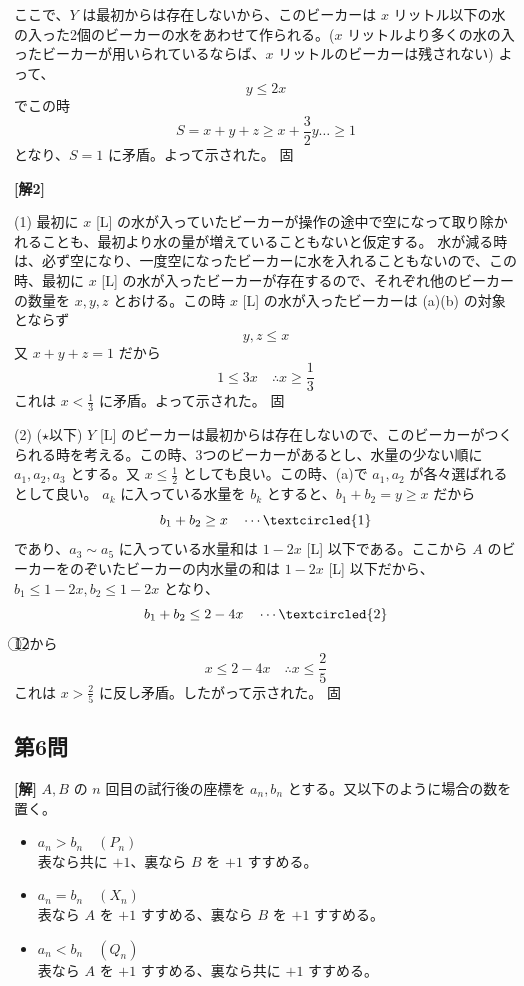 \documentclass[../main.tex]{subfiles}
\begin{document}
ここで、$Y$ は最初からは存在しないから、このビーカーは $x$ リットル以下の水の入った2個のビーカーの水をあわせて作られる。($x$ リットルより多くの水の入ったビーカーが用いられているならば、$x$ リットルのビーカーは残されない)
よって、
\[
  y \le 2x
\]
でこの時
\[
  S = x + y + z \ge x + \frac{3}{2}y \dots \ge 1
\]
となり、$S=1$ に矛盾。よって示された。 \hfill $\text{固}$

\bigskip

\noindent
\textbf{[解2]}

\medskip

\noindent
(1) 最初に $x$ [L] の水が入っていたビーカーが操作の途中で空になって取り除かれることも、最初より水の量が増えていることもないと仮定する。
水が減る時は、必ず空になり、一度空になったビーカーに水を入れることもないので、この時、最初に $x$ [L] の水が入ったビーカーが存在するので、それぞれ他のビーカーの数量を $x, y, z$ とおける。この時 $x$ [L] の水が入ったビーカーは (a)(b) の対象とならず
\[
  y, z \le x
\]
又 $x+y+z = 1$ だから
\[
  1 \le 3x \quad \therefore x \ge \frac{1}{3}
\]
これは $x < \frac{1}{3}$ に矛盾。よって示された。 \hfill $\text{固}$

\medskip

\noindent
(2) ($\star$以下) $Y$ [L] のビーカーは最初からは存在しないので、このビーカーがつくられる時を考える。この時、3つのビーカーがあるとし、水量の少ない順に $a_1, a_2, a_3$ とする。又 $x \le \frac{1}{2}$ としても良い。この時、(a)で $a_1, a_2$ が各々選ばれるとして良い。
$a_k$ に入っている水量を $b_k$ とすると、$b_1+b_2 = y \ge x$ だから
\[
  b_1+b_2 \ge x \quad \cdots \textcircled{1}
\]
であり、$a_3 \sim a_5$ に入っている水量和は $1-2x$ [L] 以下である。ここから $A$ のビーカーをのぞいたビーカーの内水量の和は $1-2x$ [L] 以下だから、$b_1 \le 1-2x, b_2 \le 1-2x$ となり、
\[
  b_1+b_2 \le 2-4x \quad \cdots \textcircled{2}
\]
\textcircled{1}\textcircled{2}から
\[
  x \le 2-4x \quad \therefore x \le \frac{2}{5}
\]
これは $x > \frac{2}{5}$ に反し矛盾。したがって示された。 \hfill $\text{固}$

\bigskip

\subsection*{第6問}

\noindent
\textbf{[解]} $A, B$ の $n$ 回目の試行後の座標を $a_n, b_n$ とする。又以下のように場合の数を置く。

\begin{itemize}
  \item[$1^\circ$] $a_n > b_n \quad (P_n)$ \\
    表なら共に $+1$、裏なら $B$ を $+1$ すすめる。
  \item[$2^\circ$] $a_n = b_n \quad (X_n)$ \\
    表なら $A$ を $+1$ すすめる、裏なら $B$ を $+1$ すすめる。
  \item[$3^\circ$] $a_n < b_n \quad (Q_n)$ \\
    表なら $A$ を $+1$ すすめる、裏なら共に $+1$ すすめる。
\end{itemize}
\end{document}

